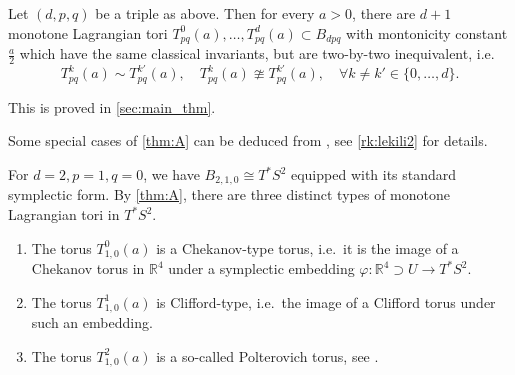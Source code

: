 \documentclass[12pt,a4paper,abstract=true,draft]{scrartcl}
\begin{document}
\begin{maintheorem}
    \label{thm:A}
    Let $(d,p,q)$ be a triple as above.
Then for every $a>0$, there are $d+1$ monotone Lagrangian tori $T^0_{pq}(a), \ldots , T^d_{pq}(a) \subset B_{dpq}$ with montonicity constant $\frac{a}{2}$ which have the same classical invariants, but are two-by-two inequivalent, i.e.\ 
    \begin{equation}
        T^k_{pq}(a) \sim T^{k'}_{pq}(a), \quad 
         T^k_{pq}(a) \ncong T^{k'}_{pq}(a), \quad
        \forall k \neq k' \in \{0,\ldots,d\}.
    \end{equation}
\end{maintheorem}

This is proved in \cref{sec:main_thm}.

\begin{remark}
    \label{rk:lekili}
    Some special cases of \cref{thm:A} can be deduced from \cite{LekMay14}, see \cref{rk:lekili2} for details.
\end{remark}

\begin{example}
    \label{ex:cotangent}
    For $d=2, p=1, q=0$, we have $B_{2,1,0} \cong T^*S^2$ equipped with its standard symplectic form.
By \cref{thm:A}, there are three distinct types of monotone Lagrangian tori in $T^*S^2$. 
    \begin{enumerate}
        \item The torus $T^0_{1,0}(a)$ is a Chekanov-type torus, i.e.\ it is the image of a Chekanov torus in $\mathbb{R}^4$ under a symplectic embedding $\varphi \colon \mathbb{R}^4 \supset U \rightarrow T^*S^2$.
        \item The torus $T^1_{1,0}(a)$ is Clifford-type, i.e.\ the image of a Clifford torus under such an embedding.
        \item The torus $T^2_{1,0}(a)$ is a so-called Polterovich torus, see \cite{AlbFra08}. 
    \end{enumerate} 
\end{example}
\end{document}

